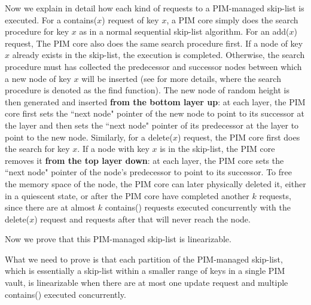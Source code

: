 \documentclass[11pt, letterpaper]{article}   	%
\begin{document}
Now we explain in detail how each kind of requests to a PIM-managed skip-list is executed. 
For a contains($x$) request of key $x$, a PIM core simply does the search procedure for key $x$
as in a normal sequential skip-list algorithm. 
For an add($x$) request, The PIM core also does the same search procedure first. 
If a node of key $x$ already exists in the skip-list, the execution is completed.
Otherwise, the search procedure must has collected the predecessor and successor nodes 
between which a new node of key $x$ will be inserted 
(see \cite{Herlihy08} for more details, where the search procedure is denoted as the find function). 
The new node of random height is then generated and inserted \textbf{from the bottom layer up}: at each layer, 
the PIM core first sets the ``next node" pointer of the new node to point to its successor at the layer 
and then sets the ``next node" pointer of its predecessor at the layer to point to the new node. 
Similarly, for a delete($x$) request, the PIM core first does the search for key $x$. 
If a node with key $x$ is in the skip-list, the PIM core removes it \textbf{from the top layer down}: 
at each layer, the PIM core sets the ``next node" pointer of the node's predecessor to point to its successor.
To free the memory space of the node, the PIM core can later physically deleted it, either in a quiescent 
state, or after the PIM core have completed another $k$ requests, since there are at almost $k$ contains() 
requests executed concurrently with the delete($x$) request and requests after that will never reach the node. 

Now we prove that this PIM-managed skip-list is linearizable. 

\proof
What we need to prove is that each partition of the PIM-managed skip-list, 
which is essentially a skip-list within a smaller range of keys in a single PIM vault, 
is linearizable when there are at most one update request and multiple contains() executed concurrently.   
\end{document}
